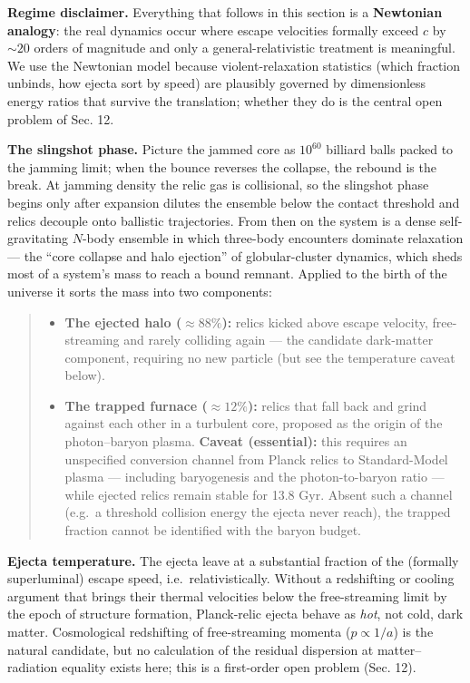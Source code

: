 \documentclass[
]{article}
\providecommand{\tightlist}{%
  \setlength{\itemsep}{0pt}\setlength{\parskip}{0pt}}
\begin{document}
\textbf{Regime disclaimer.} Everything that follows in this section is a
\textbf{Newtonian analogy}: the real dynamics occur where escape
velocities formally exceed \(c\) by \(\sim\!20\) orders of magnitude and
only a general-relativistic treatment is meaningful. We use the
Newtonian model because violent-relaxation statistics (which fraction
unbinds, how ejecta sort by speed) are plausibly governed by
dimensionless energy ratios that survive the translation; whether they
do is the central open problem of Sec. 12.

\textbf{The slingshot phase.} Picture the jammed core as \(10^{60}\)
billiard balls packed to the jamming limit; when the bounce reverses the
collapse, the rebound is the break. At jamming density the relic gas is
collisional, so the slingshot phase begins only after expansion dilutes
the ensemble below the contact threshold and relics decouple onto
ballistic trajectories. From then on the system is a dense
self-gravitating \(N\)-body ensemble in which three-body encounters
dominate relaxation --- the ``core collapse and halo ejection'' of
globular-cluster dynamics, which sheds most of a system's mass to reach
a bound remnant. Applied to the birth of the universe it sorts the mass
into two components:

\begin{quote}
\begin{itemize}
\tightlist
\item
  \textbf{The ejected halo (\(\approx 88\%\)):} relics kicked above
  escape velocity, free-streaming and rarely colliding again --- the
  candidate dark-matter component, requiring no new particle (but see
  the temperature caveat below).
\item
  \textbf{The trapped furnace (\(\approx 12\%\)):} relics that fall back
  and grind against each other in a turbulent core, proposed as the
  origin of the photon--baryon plasma. \textbf{Caveat (essential):} this
  requires an unspecified conversion channel from Planck relics to
  Standard-Model plasma --- including baryogenesis and the
  photon-to-baryon ratio --- while ejected relics remain stable for 13.8
  Gyr. Absent such a channel (e.g.~a threshold collision energy the
  ejecta never reach), the trapped fraction cannot be identified with
  the baryon budget.
\end{itemize}
\end{quote}

\textbf{Ejecta temperature.} The ejecta leave at a substantial fraction
of the (formally superluminal) escape speed, i.e.~relativistically.
Without a redshifting or cooling argument that brings their thermal
velocities below the free-streaming limit by the epoch of structure
formation, Planck-relic ejecta behave as \emph{hot}, not cold, dark
matter. Cosmological redshifting of free-streaming momenta
(\(p \propto 1/a\)) is the natural candidate, but no calculation of the
residual dispersion at matter--radiation equality exists here; this is a
first-order open problem (Sec. 12).
\end{document}
